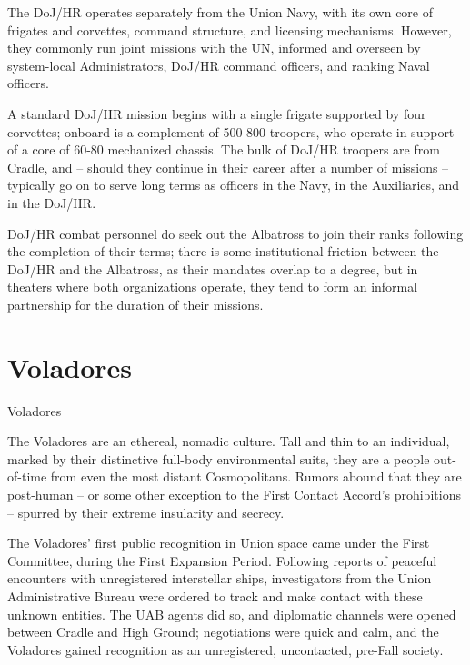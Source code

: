 The DoJ/HR operates separately from the Union Navy, with its own core of frigates and corvettes,  
command structure, and licensing mechanisms. However, they commonly run joint missions with  
the UN, informed and overseen by system-local Administrators, DoJ/HR command officers, and  
ranking Naval officers.       

A standard DoJ/HR mission begins with a single frigate supported by four corvettes; onboard is a  
complement of 500-800 troopers, who operate in support of a core of 60-80 mechanized chassis.  
The bulk of DoJ/HR troopers are from Cradle, and -- should they continue in their career after a  
number of missions -- typically go on to serve long terms as officers in the Navy, in the Auxiliaries,  
and in the DoJ/HR.   

DoJ/HR combat personnel do seek out the Albatross to join their ranks following the completion of  
their terms; there is some institutional friction between the DoJ/HR and the Albatross, as their  
mandates overlap to a degree, but in theaters where both organizations operate, they tend to form  
an informal partnership for the duration of their missions.   

                                                                                                         

\section{Voladores}
  
Voladores   

The Voladores are an ethereal, nomadic culture. Tall and thin to an individual, marked by their  
distinctive full-body environmental suits, they are a people out-of-time from even the most  
distant Cosmopolitans. Rumors abound that they are post-human -- or some other exception to  
the First Contact Accord’s prohibitions -- spurred by their extreme insularity and secrecy. 
 

The Voladores’ first public recognition in Union space came under the First Committee, during  
the First Expansion Period. Following reports of peaceful encounters with unregistered  
interstellar ships, investigators from the Union Administrative Bureau were ordered to track and  
make contact with these unknown entities. The UAB agents did so, and diplomatic channels  
were opened between Cradle and High Ground; negotiations were quick and calm, and the  
Voladores gained recognition as an unregistered, uncontacted, pre-Fall society.
 

